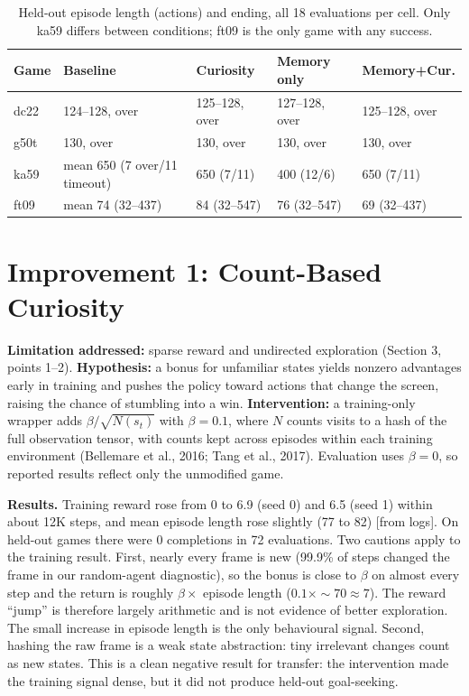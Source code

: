 \documentclass[11pt,a4paper]{article}
\begin{document}
\begin{table}[H]
\centering
\caption{Held-out episode length (actions) and ending, all 18 evaluations per cell. Only ka59 differs between conditions; ft09 is the only game with any success.}
\label{tab:heldout}
\small
\begin{tabularx}{\linewidth}{@{}lYYYY@{}}
\toprule
\textbf{Game} & \textbf{Baseline} & \textbf{Curiosity} & \textbf{Memory only} & \textbf{Memory+Cur.} \\
\midrule
 dc22 & 124--128, over & 125--128, over & 127--128, over & 125--128, over \\
 g50t & 130, over & 130, over & 130, over & 130, over \\
 ka59 & mean 650 (7 over/11 timeout) & 650 (7/11) & 400 (12/6) & 650 (7/11) \\
 ft09 & mean 74 (32--437) & 84 (32--547) & 76 (32--547) & 69 (32--437) \\
\bottomrule
\end{tabularx}
\end{table}

\section{Improvement 1: Count-Based Curiosity}

\textbf{Limitation addressed:} sparse reward and undirected exploration (Section 3, points 1--2). \textbf{Hypothesis:} a bonus for unfamiliar states yields nonzero advantages early in training and pushes the policy toward actions that change the screen, raising the chance of stumbling into a win. \textbf{Intervention:} a training-only wrapper adds $\beta/\sqrt{N(s_t)}$ with $\beta=0.1$, where $N$ counts visits to a hash of the full observation tensor, with counts kept across episodes within each training environment (Bellemare et al., 2016; Tang et al., 2017). Evaluation uses $\beta=0$, so reported results reflect only the unmodified game.

\textbf{Results.} Training reward rose from 0 to 6.9 (seed 0) and 6.5 (seed 1) within about 12K steps, and mean episode length rose slightly (77 to 82) [from logs]. On held-out games there were 0 completions in 72 evaluations. Two cautions apply to the training result. First, nearly every frame is new (99.9\% of steps changed the frame in our random-agent diagnostic), so the bonus is close to $\beta$ on almost every step and the return is roughly $\beta\times$ episode length ($0.1\times\sim70\approx7$). The reward ``jump'' is therefore largely arithmetic and is not evidence of better exploration. The small increase in episode length is the only behavioural signal. Second, hashing the raw frame is a weak state abstraction: tiny irrelevant changes count as new states. This is a clean negative result for transfer: the intervention made the training signal dense, but it did not produce held-out goal-seeking.
\end{document}
